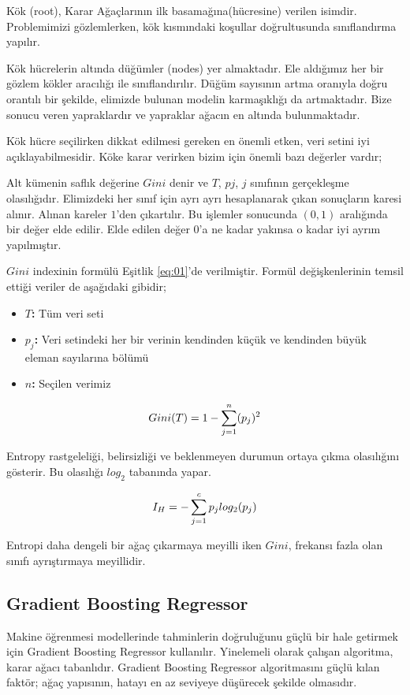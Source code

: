 \documentclass[conference]{IEEEtran}
\begin{document}
\quad Kök (root), Karar Ağaçlarının ilk basamağına(hücresine) verilen isimdir. Problemimizi gözlemlerken, kök kısmındaki koşullar doğrultusunda sınıflandırma yapılır.

\quad Kök hücrelerin altında düğümler (nodes) yer almaktadır. Ele aldığımız her bir gözlem kökler aracılığı ile sınıflandırılır. Düğüm sayısının artma oranıyla doğru orantılı bir şekilde, elimizde bulunan modelin karmaşıklığı da artmaktadır. Bize sonucu veren yapraklardır ve yapraklar ağacın en altında bulunmaktadır\cite{4}.

\quad Kök hücre seçilirken dikkat edilmesi gereken en önemli etken, veri setini iyi açıklayabilmesidir. Köke karar verirken bizim için önemli bazı değerler vardır\cite{4};

\quad Alt kümenin saflık değerine $Gini$ denir ve $T$, $pj$, $j$ sınıfının gerçekleşme olasılığıdır. Elimizdeki her sınıf için ayrı ayrı hesaplanarak çıkan sonuçların karesi alınır. Alınan kareler $1$’den çıkartılır. Bu işlemler sonucunda $(0, 1)$ aralığında bir değer elde edilir. Elde edilen değer $0$’a ne kadar yakınsa o kadar iyi ayrım yapılmıştır\cite{4}.

\quad $Gini$ indexinin formülü Eşitlik \ref{eq:01}'de verilmiştir\cite{15}. Formül değişkenlerinin temsil ettiği veriler de aşağıdaki gibidir;
\begin{itemize}
\item \textbf{$T$:} Tüm veri seti
\item \textbf{$p_{j}$:} Veri setindeki her bir verinin kendinden küçük ve kendinden büyük eleman sayılarına bölümü
\item \textbf{$n$:}  Seçilen verimiz
\end{itemize}

\begin{equation}
\label{eq:01}
\Large Gini(T)=1-\sum_{j=1}^{n}(p_{j})^2
\end{equation}

\pagebreak
\quad Entropy rastgeleliği, belirsizliği ve beklenmeyen durumun ortaya çıkma olasılığını gösterir\cite{5}.  Bu olasılığı $log_{2}$ tabanında yapar\cite{4}.

\begin{equation}
\label{eq:02}
\Large I_{H}=-\sum_{j=1}^{c}p_{j}log_{2}(p_{j})
\end{equation}

\quad Entropi daha dengeli bir ağaç çıkarmaya meyilli iken $Gini$, frekansı fazla olan sınıfı ayrıştırmaya meyillidir.

\subsection{\textbf{Gradient Boosting Regressor}}
\quad Makine öğrenmesi modellerinde tahminlerin doğruluğunu güçlü bir hale getirmek için Gradient Boosting Regressor kullanılır. Yinelemeli olarak çalışan algoritma, karar ağacı tabanlıdır. Gradient Boosting Regressor algoritmasını güçlü kılan faktör; ağaç yapısının, hatayı en az seviyeye düşürecek şekilde olmasıdır\cite{6}.
\end{document}
